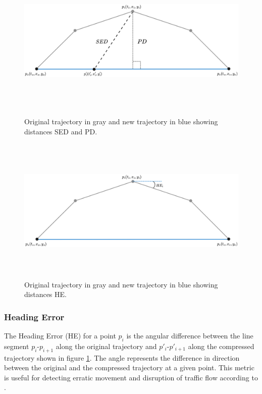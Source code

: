 \begin{figure}[ht]
    \begin{minipage}[b]{0.5\linewidth}
        \centering
        \includegraphics[width=\linewidth, height=7cm, keepaspectratio]{./figures/sed.png}
        \caption{Original trajectory in gray and new trajectory in blue showing distances SED and PD.}
        \label{fig:sed}
    \end{minipage}
    \begin{minipage}[b]{0.5\linewidth}
        \centering
        \includegraphics[width=\linewidth, height=7cm, keepaspectratio]{./figures/heading_error.png}
        \caption{Original trajectory in gray and new trajectory in blue showing distances HE.}
        \label{fig:hed}
    \end{minipage}
\end{figure}

\subsubsection{Heading Error}
The Heading Error (HE) for a point $p_{i}$ is the angular difference between the line segment $p_{i}$-$p_{i+1}$ along the original trajectory and $p'_{i}$-$p'_{i+1}$ along the compressed trajectory shown in figure \ref{fig:hed}. The angle represents the difference in direction between the original and the compressed trajectory at a given point. This metric is useful for detecting erratic movement and disruption of traffic flow according to \cite{TrajFramework}.

